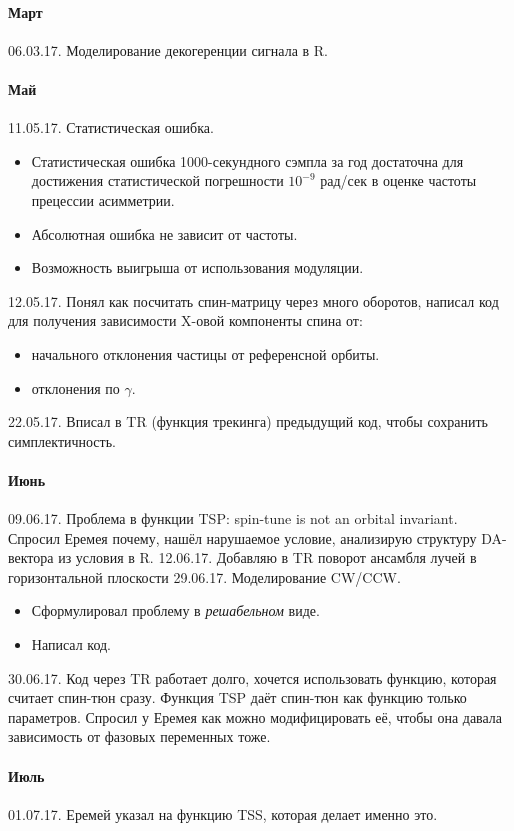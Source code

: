 \documentclass{report}
\begin{document}
\paragraph{Март}
06.03.17. Моделирование декогеренции сигнала в R.
\paragraph{Май}
11.05.17. Статистическая ошибка.
\begin{itemize}
	\item Статистическая ошибка 1000-секундного сэмпла за год достаточна для достижения статистической погрешности $10^{-9}$ рад/сек в оценке частоты прецессии асимметрии.
	\item Абсолютная ошибка не зависит от частоты.
	\item Возможность выигрыша от использования модуляции.
\end{itemize}
12.05.17. Понял как посчитать спин-матрицу через много оборотов, написал код для получения зависимости X-овой компоненты спина от:
\begin{itemize}
	\item начального отклонения частицы от референсной орбиты.
	\item отклонения по $\gamma$.
\end{itemize}
22.05.17. Вписал в TR (функция трекинга) предыдущий код, чтобы сохранить симплектичность.
\paragraph{Июнь}
09.06.17. Проблема в функции TSP: spin-tune is not an orbital invariant. Спросил Еремея почему, нашёл нарушаемое условие, анализирую структуру DA-вектора из условия в R.
12.06.17. Добавляю в TR поворот ансамбля лучей в горизонтальной плоскости 
29.06.17. Моделирование CW/CCW.
\begin{itemize}
	\item Сформулировал проблему в \emph{решабельном} виде.
	\item Написал код.
\end{itemize}
30.06.17. Код через TR работает долго, хочется использовать функцию, которая считает спин-тюн сразу. Функция TSP даёт спин-тюн как функцию только параметров. Спросил у Еремея как можно модифицировать её, чтобы она давала зависимость от фазовых переменных тоже.
\paragraph{Июль}
01.07.17. Еремей указал на функцию TSS, которая делает именно это. 
\end{document}
